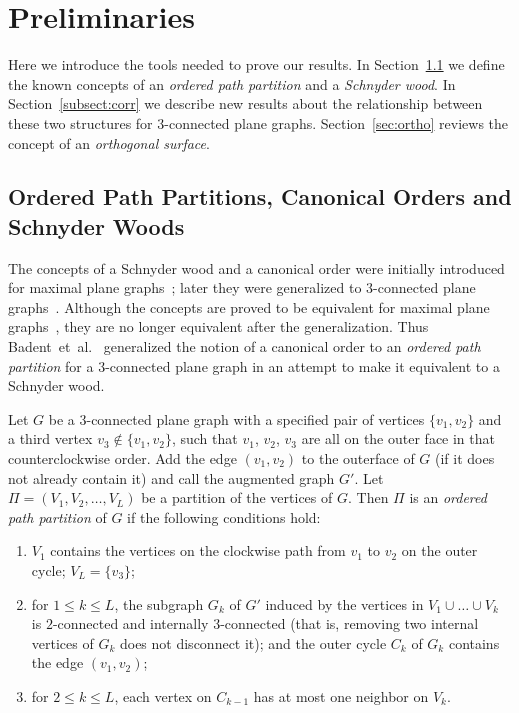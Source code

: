 \documentclass{article}
\newcommand{\df}{\textit}
\begin{document}
\section{Preliminaries}
\label{sec:prelim}

Here we introduce the tools needed to prove our results. In Section~\ref{subsect:def} we define
the known concepts of an \df{ordered path partition} and a \df{Schnyder wood}. In Section~\ref{subsect:corr} we describe new results about the relationship between these two structures for  $3$-connected plane graphs. Section~\ref{sec:ortho} reviews the concept of an \df{orthogonal surface}.

\subsection{Ordered Path Partitions, Canonical Orders and Schnyder Woods}
\label{subsect:def}

The concepts of a Schnyder wood and a canonical order
were initially introduced for maximal plane graphs~\cite{FPP90,Sch90}; later they were generalized
 to $3$-connected plane graphs~\cite{Kan96,FZ08}.
Although the concepts are proved to be equivalent for maximal plane graphs~\cite{FM01},
 they are no longer equivalent after the generalization. Thus Badent~et~al.~\cite{BBC11}
 generalized the notion of a canonical order to an {\em ordered path partition} for a $3$-connected
 plane graph in an attempt to make it equivalent to a Schnyder wood.


Let $G$ be a $3$-connected plane graph with a specified pair of vertices $\{v_1, v_2\}$ and a third vertex
$v_3\notin\{v_1,v_2\}$, such that $v_1$, $v_2$, $v_3$ are all on the outer face in that counterclockwise
order. Add the edge $(v_1,v_2)$ to the outerface of $G$ (if it does not already contain it) and call the augmented graph
$G'$. Let $\Pi=(V_1,V_2,\ldots,V_L)$ be a partition of the vertices of $G$.
Then $\Pi$ is an \df{ordered path partition} of $G$ if the following conditions hold:


\begin{enumerate}[(1)]


	\item $V_1$ contains the vertices on the clockwise path from $v_1$ to $v_2$ on the outer
		cycle;
		$V_L=\{v_3\}$;
	\item for $1\le k\le L$, the subgraph $G_k$ of $G'$ induced by the vertices in
		$V_1\cup\ldots\cup V_k$ is $2$-connected and internally $3$-connected
		(that is, removing two internal vertices of $G_k$ does not disconnect it); and
		the outer cycle $C_k$ of $G_k$ contains the edge $(v_1,v_2)$;

	\item for $2\le k\le L$, each vertex on $C_{k-1}$ has at most one neighbor on $V_k$.
\end{enumerate}
\end{document}
